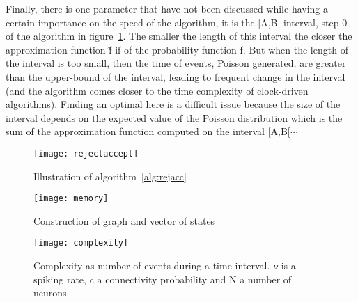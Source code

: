 \documentclass{article}
\begin{document}
		Finally, there is one parameter that have not been discussed while having a certain importance on the speed of the algorithm, it is the [A,B[ interval, step 0 of the algorithm in figure~\ref{fig:rejacc}. The smaller the length of this interval the closer the approximation function \~f if of the probability function f. But when the length of the interval is too small, then the time of events, Poisson generated, are greater than the upper-bound of the interval, leading to frequent change in the interval (and the algorithm comes closer to the time complexity of clock-driven algorithms). Finding an optimal here is a difficult issue because the size of the interval depends on the expected value of the Poisson distribution which is the sum of the approximation function computed on the interval [A,B[$\cdots$
		\begin{landscape}
			\begin{figure}
				\begin{center}
					\texttt{[image: rejectaccept]}
				\end{center}
				\caption{Illustration of algorithm~\ref{alg:rejacc}}\label{fig:rejacc}
			\end{figure}
		\end{landscape}
		\begin{landscape}
			\begin{figure}
				\texttt{[image: memory]}
				\caption{Construction of graph and vector of states}
				\label{fig:construction}
			\end{figure}
		\end{landscape}
		\begin{landscape}
			\begin{figure}
				\centering
				\texttt{[image: complexity]}
				\caption{Complexity as number of events during a time interval. $\nu$ is a spiking rate, c a connectivity probability and N a number of neurons.}\label{fig:complexity}
			\end{figure}
		\end{landscape}
\end{document}
